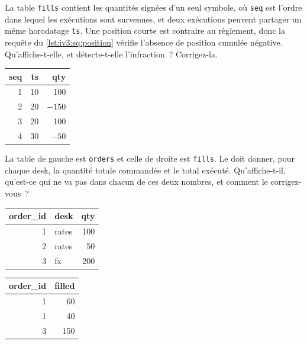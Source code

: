 \begin{question}\label{iq:iv3:sql-and-data:9}
La table \texttt{fills} contient les quantités signées d'un seul symbole, où \texttt{seq} est l'ordre dans lequel les exécutions sont survenues, et deux exécutions peuvent partager un même horodatage \texttt{ts}. Une position courte est contraire au règlement, donc la requête du \cref{lst:iv3:sq:position} vérifie l'absence de position cumulée négative. Qu'affiche-t-elle, et détecte-t-elle l'infraction~? Corrigez-la.
\begin{center}\small
\begin{tabular}{rrr}
seq & ts & qty\\\hline
1 & 10 & 100\\
2 & 20 & $-150$\\
3 & 20 & 100\\
4 & 30 & $-50$
\end{tabular}
\end{center}
\label{lst:iv3:sq:position}
\end{question}

\begin{question}\label{iq:iv3:sql-and-data:10}
La table de gauche est \texttt{orders} et celle de droite est \texttt{fills}. Le  doit donner, pour chaque desk, la quantité totale commandée et le total exécuté. Qu'affiche-t-il, qu'est-ce qui ne va pas dans chacun de ces deux nombres, et comment le corrigez-vous~?
\begin{center}\small
\begin{tabular}{rlr}
order\_id & desk & qty\\\hline
1 & rates & 100\\
2 & rates & 50\\
3 & fx & 200
\end{tabular}\qquad
\begin{tabular}{rr}
order\_id & filled\\\hline
1 & 60\\
1 & 40\\
3 & 150
\end{tabular}
\end{center}
\label{lst:iv3:sq:fanout}
\end{question}

